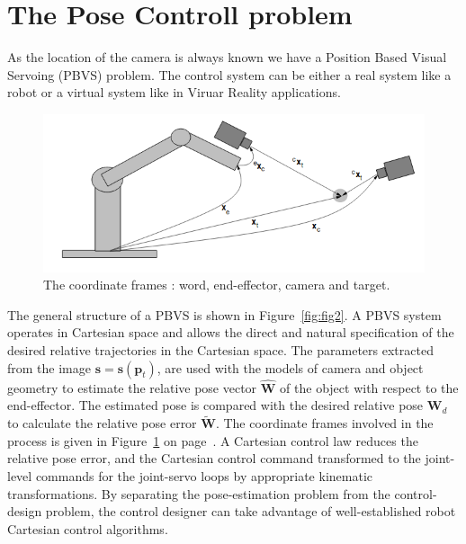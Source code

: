 \documentclass[a4paper,12pt]{article}
\begin{document}
\section{The Pose Controll problem}
As the location of the camera is always known we have a Position Based Visual Servoing (PBVS) problem. The control system can be either a real system like a robot or a virtual system like in Viruar Reality applications.
\begin{figure}[b!]
         \centering
         \includegraphics[width=13cm]{coordsys.png}
         \caption{The coordinate frames : word, end-effector, camera and target.}
        \label{fig:coord}
\end{figure}
The general structure of a PBVS is shown in Figure~\ref{fig:fig2}. A PBVS system operates in Cartesian space and
allows the direct and natural specification of the desired relative trajectories in the Cartesian space.  The parameters extracted from the image $\mathbf{s} = \mathbf{s}(\mathbf{p}_t)$, are used with the models of camera
and object geometry to estimate the relative pose vector $\widehat{\mathbf{W}}$ of the object with respect to the end-effector. The estimated pose is compared with the desired relative pose $\mathbf{W}_d$ to calculate the relative pose error $\widetilde{\mathbf{W}}$.  The coordinate frames involved in the process is given in Figure~\ref{fig:coord} on page~\pageref{fig:coord}.
A Cartesian control law reduces the relative pose error, and the Cartesian control command transformed to 
the joint-level commands for the joint-servo loops by appropriate kinematic transformations.
By separating the pose-estimation problem from the control-design
problem, the control designer can take advantage of well-established robot Cartesian control algorithms.
 
\end{document}
